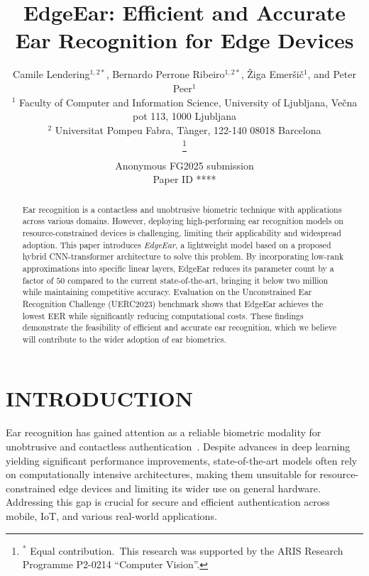 \documentclass[a4paper, 10pt, conference]{ieeeconf}
\title{\LARGE \bf
EdgeEar: Efficient and Accurate Ear Recognition for Edge Devices
}
\author{\parbox{16cm}{\centering
    {\large Camile Lendering$^{1,2*}$, Bernardo Perrone Ribeiro$^{1,2*}$, \v{Z}iga Emer\v{s}i\v{c}$^{1}$, and Peter Peer$^{1}$}\\
    {\normalsize
    $^1$ Faculty of Computer and Information Science, University of Ljubljana, Ve\v{c}na pot 113, 1000 Ljubljana\\
    $^2$ Universitat Pompeu Fabra, Tànger, 122-140 08018 Barcelona}}
    \thanks{$^*$ Equal contribution.\
    This research was supported by the ARIS Research Programme P2-0214 ``Computer Vision''.}%
}
\def\FGPaperID{****}
\begin{document}
\ifFGfinal
\thispagestyle{empty}
\pagestyle{empty}
\else
\author{Anonymous FG2025 submission\\ Paper ID \FGPaperID \\}
\pagestyle{plain}
\fi
\maketitle



\begin{abstract}

Ear recognition is a contactless and unobtrusive biometric technique with applications across various domains. However, deploying high-performing ear recognition models on resource-constrained devices is challenging, limiting their applicability and widespread adoption. This paper introduces \textit{EdgeEar}, a lightweight model based on a proposed hybrid CNN-transformer architecture to solve this problem. 
By incorporating low-rank approximations into specific linear layers, EdgeEar reduces its parameter count by a factor of $50$ compared to the current state-of-the-art, bringing it below two million while maintaining competitive accuracy. 
Evaluation on the Unconstrained Ear Recognition Challenge (UERC2023) benchmark shows that EdgeEar achieves the lowest EER while significantly reducing computational costs.
These findings demonstrate the feasibility of efficient and accurate ear recognition, which we believe will contribute to the wider adoption of ear biometrics.


\end{abstract}


\section{INTRODUCTION}

Ear recognition has gained attention as a reliable biometric modality for unobtrusive and contactless authentication~\cite{emersic2017}. Despite advances in deep learning yielding significant performance improvements, state-of-the-art models often rely on computationally intensive architectures, making them unsuitable for resource-constrained edge devices and limiting its wider use on general hardware. Addressing this gap is crucial for secure and efficient authentication across mobile, IoT, and various real-world applications.
\end{document}
